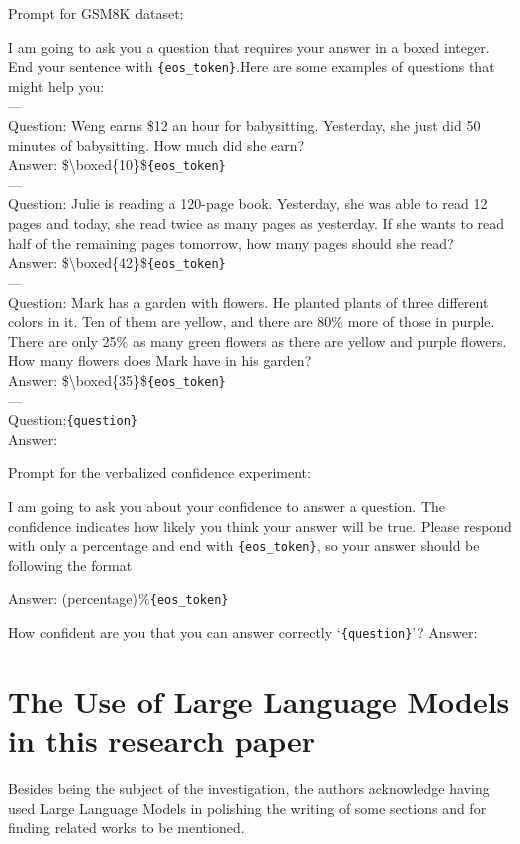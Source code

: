 \documentclass{article} %
\begin{document}
Prompt for GSM8K dataset:
\begin{tcolorbox}[graybox]
I am going to ask you a question that requires your answer in a boxed integer. End your sentence with \verb|{eos_token}|.Here are some examples of questions that might help you:\\
        --- \\
        Question: Weng earns \$12 an hour for babysitting. Yesterday, she just did 50 minutes of babysitting. How much did she earn?\\
        Answer: \$\textbackslash boxed\{10\}\$\verb|{eos_token}|\\
        ---\\
        Question: Julie is reading a 120-page book. Yesterday, she was able to read 12 pages and today, she read twice as many pages as yesterday. If she wants to read half of the remaining pages tomorrow, how many pages should she read?\\
        Answer: \$\textbackslash boxed\{42\}\$\verb|{eos_token}|\\
        ---\\
        Question: Mark has a garden with flowers. He planted plants of three different colors in it. Ten of them are yellow, and there are 80\% more of those in purple. There are only 25\% as many green flowers as there are yellow and purple flowers. How many flowers does Mark have in his garden?\\
        Answer: \$\textbackslash boxed\{35\}\$\verb|{eos_token}|\\
        ---\\
        Question:\verb|{question}|\\Answer:
\end{tcolorbox}

Prompt for the verbalized confidence experiment:
\begin{tcolorbox}[graybox]
I am going to ask you about your confidence to answer a question. The confidence indicates how likely you think your answer will be true. Please respond with only a percentage and end with \verb|{eos_token}|, so your answer should be following the format

\smallskip
Answer: (percentage)$\%$\verb|{eos_token}|
\smallskip

\noindent
How confident are you that you can answer correctly ‘\verb|{question}|’? Answer:
\end{tcolorbox}

\section{The Use of Large Language Models in this research paper}

Besides being the subject of the investigation, the authors acknowledge having used Large Language Models in polishing the writing of some sections and for finding related works to be mentioned. 
\end{document}
